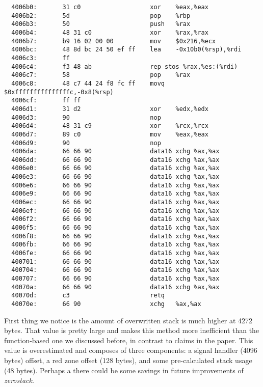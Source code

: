 \documentclass[a4paper,10pt,openright]{memoir}
\newcommand{\term}[1]{\textit{#1}}
\begin{document}
\begin{verbatim}
  4006b0:       31 c0                   xor    %eax,%eax
  4006b2:       5d                      pop    %rbp
  4006b3:       50                      push   %rax
  4006b4:       48 31 c0                xor    %rax,%rax
  4006b7:       b9 16 02 00 00          mov    $0x216,%ecx
  4006bc:       48 8d bc 24 50 ef ff    lea    -0x10b0(%rsp),%rdi
  4006c3:       ff 
  4006c4:       f3 48 ab                rep stos %rax,%es:(%rdi)
  4006c7:       58                      pop    %rax
  4006c8:       48 c7 44 24 f8 fc ff    movq   $0xfffffffffffffffc,-0x8(%rsp)
  4006cf:       ff ff 
  4006d1:       31 d2                   xor    %edx,%edx
  4006d3:       90                      nop
  4006d4:       48 31 c9                xor    %rcx,%rcx
  4006d7:       89 c0                   mov    %eax,%eax
  4006d9:       90                      nop
  4006da:       66 66 90                data16 xchg %ax,%ax
  4006dd:       66 66 90                data16 xchg %ax,%ax
  4006e0:       66 66 90                data16 xchg %ax,%ax
  4006e3:       66 66 90                data16 xchg %ax,%ax
  4006e6:       66 66 90                data16 xchg %ax,%ax
  4006e9:       66 66 90                data16 xchg %ax,%ax
  4006ec:       66 66 90                data16 xchg %ax,%ax
  4006ef:       66 66 90                data16 xchg %ax,%ax
  4006f2:       66 66 90                data16 xchg %ax,%ax
  4006f5:       66 66 90                data16 xchg %ax,%ax
  4006f8:       66 66 90                data16 xchg %ax,%ax
  4006fb:       66 66 90                data16 xchg %ax,%ax
  4006fe:       66 66 90                data16 xchg %ax,%ax
  400701:       66 66 90                data16 xchg %ax,%ax
  400704:       66 66 90                data16 xchg %ax,%ax
  400707:       66 66 90                data16 xchg %ax,%ax
  40070a:       66 66 90                data16 xchg %ax,%ax
  40070d:       c3                      retq   
  40070e:       66 90                   xchg   %ax,%ax
\end{verbatim}

First thing we notice is the amount of overwritten stack is much higher 
at 4272 bytes. That value is pretty large and makes this method more 
inefficient than the function-based one we discussed before, in 
contrast to claims in the paper\cite{whatyouc}. This value is 
overestimated and composes of three components: a signal handler (4096 
bytes) offset, a red zone offset (128 bytes), and some pre-calculated 
stack usage (48 bytes). Perhaps a there could be some savings in future 
improvements of \term{zerostack}.
\end{document}
